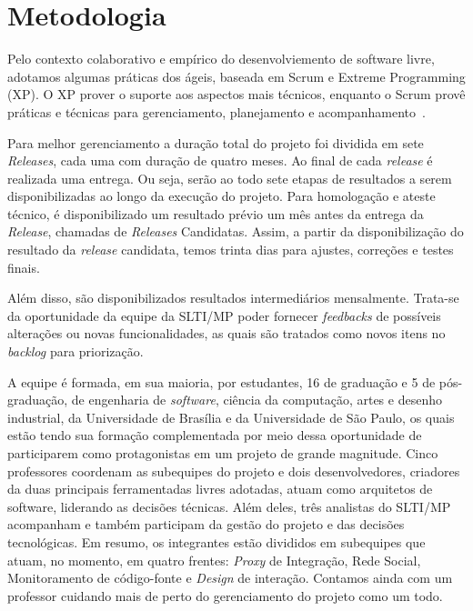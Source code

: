 \section{Metodologia}
\label{sec:metodologia}

Pelo contexto colaborativo e empírico do desenvolviemento de software livre,
adotamos algumas práticas dos ágeis, baseada em Scrum e Extreme Programming (XP).
%
O XP prover o suporte aos aspectos mais técnicos, enquanto o Scrum provê
práticas e técnicas para gerenciamento, planejamento e
acompanhamento~\cite{schwaber2001,fitzgerald2006}. 



Para melhor gerenciamento a duração total do projeto foi dividida em sete \textit{Releases}, cada uma com duração de quatro meses. Ao final de cada \textit{release} é realizada uma entrega. Ou seja, serão ao todo sete etapas de resultados a serem disponibilizadas ao longo da execução do projeto.
Para homologação e ateste técnico, é disponibilizado um resultado prévio um mês antes da entrega da \textit{Release}, chamadas de \textit{Releases} Candidatas. Assim, a partir da disponibilização do resultado da \textit{release} candidata, temos trinta dias para ajustes, correções e testes finais. 

Além disso, são disponibilizados resultados intermediários mensalmente. Trata-se da oportunidade da equipe da SLTI/MP poder fornecer \textit{feedbacks} de possíveis alterações ou novas funcionalidades, as quais são tratados como novos itens no \textit{backlog} para priorização.


A equipe é formada, em sua maioria, por estudantes, 16 de graduação e 5 de
pós-graduação, de engenharia de \textit{software}, ciência da computação, artes
e desenho industrial, da Universidade de Brasília e da Universidade de São
Paulo, os quais estão tendo sua formação complementada por meio dessa
oportunidade de participarem como protagonistas em um projeto de grande
magnitude.
%
Cinco professores coordenam as subequipes do projeto e dois desenvolvedores,
criadores da duas principais ferramentadas livres adotadas, atuam como
arquitetos de software, liderando as decisões técnicas.
%
Além deles, três analistas do SLTI/MP acompanham e também participam da gestão
do projeto e das decisões tecnológicas.
%
Em resumo, os integrantes estão divididos em subequipes que atuam, no momento,
em quatro frentes: \emph{Proxy} de Integração, Rede Social, Monitoramento de
código-fonte e \textit{Design} de interação. Contamos ainda com um professor 
cuidando mais de perto do gerenciamento do projeto como um todo.


